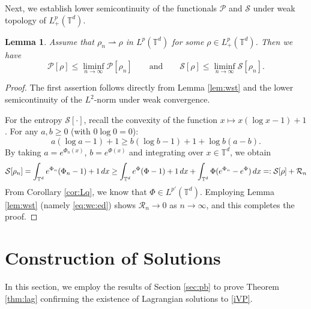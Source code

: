 \documentclass[11pt,reqno,a4paper]{amsart}
\newcommand{\intt}{\int_{\T^d}}
\newtheorem{lemma}{Lemma}[section]
\theoremstyle{definition}
\theoremstyle{remark}
\numberwithin{equation}{section}
\newcommand{\T} {\mathbb T}
\newcommand{\calP}{\mathcal P}
\newcommand{\calR}{\mathcal R}
\newcommand{\calS}{\mathcal S}
\newcommand{\weakto}{\rightharpoonup}
\newcommand{\dx}{\textnormal{d}x}
\begin{document}
 

Next, we establish lower semicontinuity of the functionals $\calP$ and $\calS$ under weak topology of $L^p_+(\T^d)$.

\begin{lemma}\label{lem:lsc}
Assume that $\rho_n \weakto \rho$ in $L^p(\T^d)$ for some $\rho \in L^p_+(\T^d)$. Then we have
\begin{equation*}
\calP[\rho] \le \liminf_{n \to \infty} \calP[\rho_n] \qquad \mbox{and}\qquad \calS[\rho] \le \liminf_{n \to \infty} \calS[\rho_n].
\end{equation*}
\end{lemma}
\begin{proof}
The first assertion follows directly from Lemma \ref{lem:wst} and the lower semicontinuity of the $L^2$-norm under weak convergence.

For the entropy $\calS[\cdot]$, recall the convexity of the function $x \mapsto x(\log x -1) +1$. For any $a,b \geq 0$ (with $0 \log 0 =0$):
\[
a(\log a-1) + 1 \ge  b(\log b -1) +1 +\log b(a-b). 
\]
By taking $a=e^{\Phi_n(x)}$, $b=e^{\Phi(x)}$ and integrating over $x\in \T^d$, we obtain
\[
\calS[\rho_n] = \intt e^{\Phi_n}(\Phi_n-1)+1 \,\dx \ge \intt e^{\Phi}(\Phi-1)+1 \,\dx + \intt \Phi(e^{\Phi_n} - e^{\Phi})\,\dx =:\calS[\rho] + \calR_n
\]
From Corollary \ref{cor:Lq}, we know that $\Phi \in L^{p'}(\T^d)$. Employing Lemma \ref{lem:wst} (namely \eqref{eq:wc:ed}) shows $\calR_n \to 0$ as $n \to \infty$, and this completes the proof.
\end{proof}

%
%
%
%
%


%
%
%
%
%


\section{Construction of Solutions} \label{sec: lag}
In this section, we employ the results of Section \ref{sec:pb} to prove Theorem \ref{thm:lag} confirming the existence of Lagrangian solutions to \eqref{iVP}.
\end{document}
